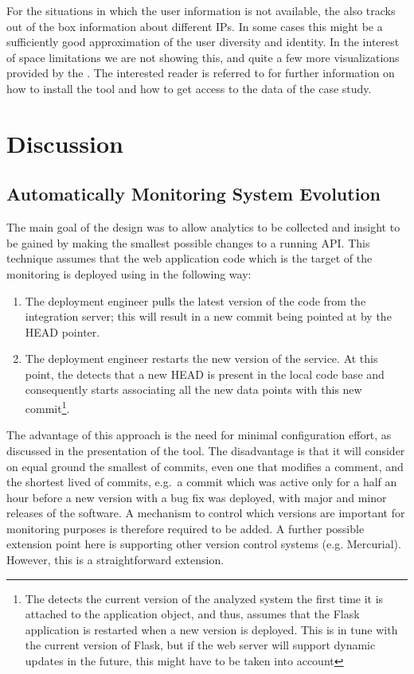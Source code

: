 \documentclass[conference]{IEEEtran}
\begin{document}
  For the situations in which the user information is not available, the \tool also tracks out of the box information about different IPs. In some cases this might be a sufficiently good approximation of the user diversity and identity. 
  In the interest of space limitations we are not showing this, and quite a few more visualizations provided by the \tool. The interested reader is referred to  for further information on how to install the tool and how to get access to the data of the case study.

\section{Discussion}

  \subsection{Automatically Monitoring System Evolution}

  The main goal of the \tool design was to allow analytics to be collected and insight to be gained by making the smallest possible changes to a running API. %
%
  This technique assumes that the web application code which is the target of the monitoring is deployed using \git in the following way: 

  \begin{enumerate}
    \item The deployment engineer pulls the latest version of the code from the integration server; this will result in a new commit being pointed at by the HEAD pointer. %
    \item The deployment engineer restarts the new version of the service. At this point, the \tool detects that a new HEAD is present in the local code base and consequently starts associating all the new data points with this new commit\footnote{The \tool detects the current version of the analyzed system the first time it is attached to the application object, and thus, assumes that the Flask application is restarted when a new version is deployed. This is in tune with the current version of Flask, but if the web server will support dynamic updates in the future, this might have to be taken into account}.
  \end{enumerate}

  The advantage of this approach is the need for minimal configuration effort, as discussed in the presentation of the tool. The disadvantage is that it will consider on equal ground the smallest of commits, even one that modifies a comment, and the shortest lived of commits, e.g.~a commit which was active only for a half an hour before a new version with a bug fix was deployed, with major and minor releases of the software. %
  A mechanism to control which versions are important for monitoring purposes is therefore required to be added.
%
  A further possible extension point here is supporting other version control systems (e.g. Mercurial). However, this is a straightforward extension.
\end{document}
